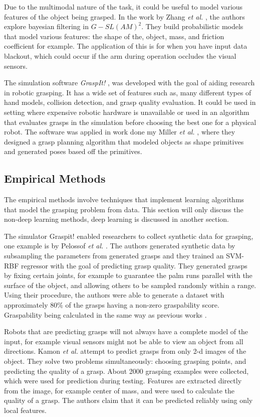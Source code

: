 \documentclass{article}
\begin{document}
Due to the multimodal nature of the task, it could be useful to model various
features of the object being grasped. In the work by Zhang \textit{et al.}
\cite{zhang12}, the authors explore bayesian filtering in $G-SL(AM)^2$. They
build probabilistic models that model various features: the shape of the,
object, mass, and friction coefficient for example. The application of this
is for when you have input data blackout, which could occur if the arm
during operation occludes the visual sensors.

The simulation software \textit{GraspIt!} \cite{miller04}, was developed with
the goal of aiding research in robotic grasping. It has a wide set of features
such as, many different types of hand models, collision detection, and grasp
quality evaluation. It could be used in setting where expensive robotic hardware
is unavailable or used in an algorithm that evaluates grasps in the simulation
before choosing the best one for a physical robot.
The software was applied in work done my Miller
\textit{et al.} \cite{miller03}, where they designed a grasp planning algorithm
that modeled objects as shape primitives and generated poses based off the
primitives.

\subsection{Empirical Methods}
The empirical methods involve techniques that implement learning algorithms that
model the grasping problem from data. This section will only discuss the
non-deep learning methods, deep learning is discussed in another section.

The simulator Graspit! \cite{miller04} enabled researchers to collect synthetic
data for grasping, one example is by Pelossof \textit{et al.} \cite{pelossof04}.
The authors generated synthetic data by subsampling the parameters from
generated grasps and they trained an
SVM-RBF regressor with the goal of predicting grasp quality. They generated
grasps by fixing certain joints, for example to guarantee the palm runs
parallel with the surface of the object, and allowing others to be sampled
randomly within a range. Using their procedure, the authors were able to
generate a dataset with approximately $80\%$ of the grasps having a non-zero
graspability score. Graspability being calculated in the same way as previous
works \cite{ferrari92}.

Robots that are predicting grasps will not always have a complete model of the
input, for example visual sensors might not be able to view an object from all
directions. Kamon \textit{et al.} \cite{kamon96} attempt to predict
grasps from only 2-d images of the object. They solve two problems
simultaneously: choosing grasping points, and predicting the quality of a grasp.
About 2000 grasping examples were collected, which were used for prediction during
testing. Features are extracted directly from the image, for example center of
mass, and were used to calculate the quality of a grasp. The authors claim
that it can be predicted reliably using only local features.
\end{document}
